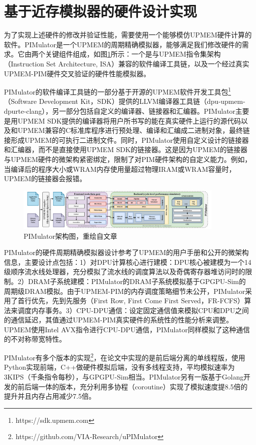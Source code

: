 \section{基于近存模拟器的硬件设计实现}
为了实现上述硬件的修改并验证性能，需要使用一个能够模仿UPMEM硬件计算的软件。PIMulator是一个UPMEM的周期精确模拟器\cite{uPimulator}，能够满足我们修改硬件的需求。它由两个关键组件组成，如图\ref{PIMulator}所示：一个是与UPMEM指令集架构（Instruction Set Architecture, ISA）兼容的软件编译工具链，以及一个经过真实UPMEM-PIM硬件交叉验证的硬件性能模拟器。

PIMulator的软件编译工具链的一部分基于开源的UPMEM软件开发工具包\footnote{https://sdk.upmem.com}（Software Development Kit，SDK）提供的LLVM\cite{LLVM}编译器工具链（dpu-upmem-dpurte-clang），另一部分包括自定义的编译器、链接器和汇编器。PIMulator主要是用UPMEM SDK提供的编译器将用户所书写的能在真实硬件上运行的源代码以及和UPMEM兼容的C标准库程序进行预处理、编译和汇编成二进制对象，最终链接形成UPMEM的可执行二进制文件。同时，PIMulator使用自定义设计的链接器和汇编器，而不是直接使用UPMEM SDK的链接器。这是因为UPMEM的链接器与UPMEM硬件的微架构紧密绑定，限制了对PIM硬件架构的自定义能力。例如，当编译后的程序大小或WRAM内存使用量超过物理IRAM或WRAM容量时，UPMEM的链接器会报错。

\begin{figure}[!htbp]
	\centering
    \includegraphics[width=0.9\textwidth]{figures/PIMulator.pdf}
	\caption[PIMulator架构图]{PIMulator架构图，重绘自文章\cite{uPimulator}}
    \label{PIMulator}
\end{figure}

PIMulator的硬件周期精确模拟器设计参考了UPMEM的用户手册和公开的微架构信息，主要设计点包括：1）对DPU计算核心进行建模：DPU核心被建模为一个14级顺序流水线处理器，充分模拟了流水线的调度算法以及奇偶寄存器堆访问时的限制。2）DRAM子系统建模：PIMulator的DRAM子系统模拟基于GPGPU-Sim的周期级DRAM模拟\cite{GPGPU-Sim}。由于UPMEM-PIM的内存调度策略细节未公开，PIMulator采用了首行优先，先到先服务（First Row, First Come First Served，FR-FCFS）算法来调度内存事务。3）CPU-DPU通信：设定固定通信值来模拟CPU和DPU之间的通信延迟，其值通过UPMEM-PIM真实硬件的系统性的性能分析来调整。UPMEM使用Intel AVX指令进行CPU-DPU通信，PIMulator同样模拟了这种通信的不对称带宽特性。

PIMulator有多个版本的实现\footnote{https://github.com/VIA-Research/uPIMulator}，在论文中实现的是前后端分离的单线程版，使用Python实现前端，C++做硬件模拟后端，没有多线程支持，平均模拟速率为3KIPS（千条指令每秒），与GPGPU-Sim相当。PIMulator另有一版基于Golang开发的前后端一体的版本，充分利用多协程（coroutine）实现了模拟速度提8.5倍的提升并且内存占用减少7.5倍。

